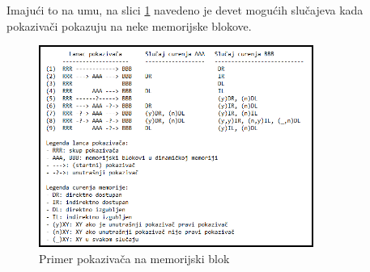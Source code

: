 \documentclass[12pt,oneside]{memoir}
\theoremstyle{plain}
\theoremstyle{definition}
\begin{document}
Imajući to na umu, na slici \ref{fig:slika2.12} navedeno je devet mogućih slučajeva kada pokazivači pokazuju na neke memorijske blokove.
\begin{figure}[!ht]
  \centering
  \includegraphics[width=0.8\textwidth]{memoryLeacking2.png}
  \caption{Primer pokazivača na memorijski blok}
  \label{fig:slika2.12}
\end{figure}
\end{document}
